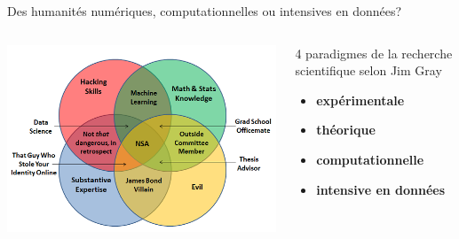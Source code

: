 \documentclass[ignorenonframetext]{beamer}
\begin{document}
\begin{frame}{Des humanités numériques, computationnelles ou intensives en données?}

\begin{columns}
	\begin{column}{0.65\textwidth}
			\includegraphics[width=\textwidth]{img/VennDiagram2.png}
		
	\end{column}
	\begin{column}{0.4\textwidth}
		\alert{4 paradigmes de la recherche scientifique selon Jim Gray}
			\begin{itemize}
				\item \textbf{expérimentale}
				\item \textbf{théorique}
				\item \textbf{computationnelle}
				\item \textbf{intensive en données}
			\end{itemize}
	\end{column}
\end{columns}

\end{frame}
\end{document}
